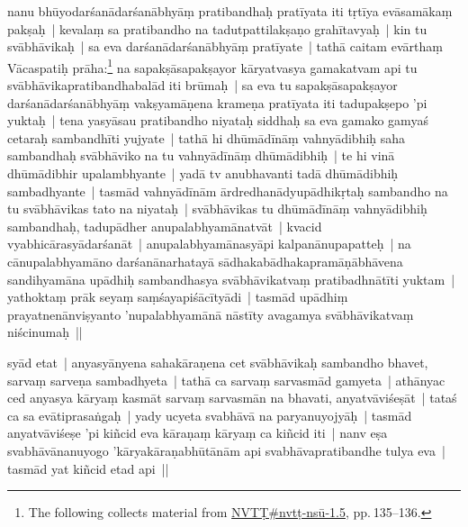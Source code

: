 \documentclass[article,a4paper]{memoir}
\begin{document}
	  \pstart nanu bhū\-yodarśanā\-darśanā\-bhyā\-ṃ pratibandhaḥ pratī\-yata iti tṛtī\-ya evā\-samā\-kaṃ pakṣaḥ | kevalaṃ sa pratibandho na tadutpattilakṣaṇo grahī\-tavyaḥ | kin tu svā\-bhā\-vikaḥ | sa eva darśanā\-darśanā\-bhyā\-ṃ pratī\-yate | tathā\- caitam evā\-rthaṃ Vā\-caspatiḥ prā\-ha:\footnote{The following collects material from \href{NVTṬ\#nvtṭ-nsū_1-1.5}{NVTṬ\#nvtṭ-nsū\--1.5}, pp. 135--136.} na sapakṣā\-sapakṣayor  kā\-ryatvasya gamakatvam api tu svā\-bhā\-vikapratibandhabalā\-d iti brū\-maḥ | sa eva tu sapakṣā\-sapakṣayor darśanā\-darśanā\-bhyā\-ṃ vakṣyamā\-ṇena krameṇa pratī\-yata iti tadupakṣepo 'pi yuktaḥ | \label{sarit__ratnakīrtinibandhāvali__122689}tena yasyā\-sau pratibandho niyataḥ siddhaḥ sa eva gamako gamyaś cetaraḥ sambandhī\-ti yujyate | tathā\- hi dhū\-mā\-dī\-nā\-ṃ vahnyā\-dibhiḥ saha sambandhaḥ svā\-bhā\-viko na tu vahnyā\-dī\-nā\-ṃ dhū\-mā\-dibhiḥ | te hi vinā\- dhū\-mā\-dibhir upalambhyante | yadā\- tv  anubhavanti tadā\- dhū\-mā\-dibhiḥ sambadhyante | tasmā\-d vahnyā\-dī\-nā\-m ā\-rdredhanā\-dyupā\-dhikṛtaḥ sambandho na tu svā\-bhā\-vikas tato na niyataḥ | svā\-bhā\-vikas tu dhū\-mā\-dī\-nā\-ṃ vahnyā\-dibhiḥ sambandhaḥ, tadupā\-dher anupalabhyamā\-natvā\-t | kvacid vyabhicā\-rasyā\-darśanā\-t | anupalabhyamā\-nasyā\-pi kalpanā\-nupapatteḥ | na cā\-nupalabhyamā\-no darśanā\-narhatayā\- sā\-dhakabā\-dhakapramā\-ṇā\-bhā\-vena sandihyamā\-na upā\-dhiḥ sambandhasya svā\-bhā\-vikatvaṃ pratibadhnā\-tī\-ti yuktam | yathoktaṃ prā\-k seyaṃ saṃśayapiśā\-cī\-tyā\-di | tasmā\-d upā\-dhiṃ prayatnenā\-nviṣyanto 'nupalabhyamā\-nā\- nā\-stī\-ty avagamya svā\-bhā\-vikatvaṃ niścinumaḥ ||
	\pend
      

	  \pstart syā\-d etat | anyasyā\-nyena sahakā\-raṇena cet svā\-bhā\-vikaḥ sambandho bhavet, sarvaṃ sarveṇa sambadhyeta | tathā\- ca sarvaṃ sarvasmā\-d gamyeta | athā\-nyac ced anyasya kā\-ryaṃ kasmā\-t sarvaṃ sarvasmā\-n na bhavati, anyatvā\-viśeṣā\-t | tataś ca sa evā\-tiprasaṅgaḥ | yady ucyeta svabhā\-vā\- na paryanuyojyā\-ḥ | tasmā\-d anyatvā\-viśeṣe 'pi kiñcid eva kā\-raṇaṃ kā\-ryaṃ ca kiñcid iti | nanv eṣa svabhā\-vā\-nanuyogo 'kā\-ryakā\-raṇabhū\-tā\-nā\-m api svabhā\-vapratibandhe tulya eva | tasmā\-d yat kiñcid etad api ||\label{sarit__ratnakīrtinibandhāvali__124304}
	\pend
      
\end{document}
